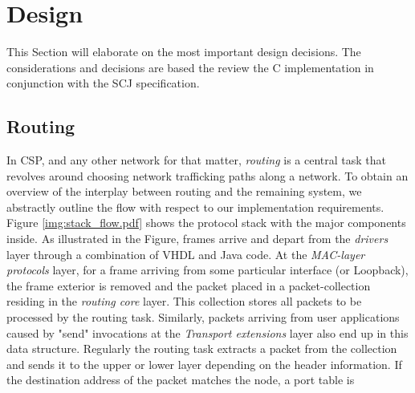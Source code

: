 \section{Design}
This Section will elaborate on the most important design decisions. The considerations and decisions are based the review the C implementation in conjunction with the SCJ specification.

\subsection{Routing}
In CSP, and any other network for that matter, \textit{routing} is a central task that revolves around choosing network trafficking paths along a network. To obtain an overview of the interplay between routing and the remaining system, we abstractly outline the flow with respect to our implementation requirements. Figure \ref{img:stack_flow.pdf} shows the protocol stack with the major components inside. As illustrated in the Figure, frames arrive and depart from the \textit{drivers} layer through a combination of VHDL and Java code. At the \textit{MAC-layer protocols} layer, for a frame arriving from some particular interface (\iic or Loopback), the frame exterior is removed and the packet placed in a packet-collection residing in the \textit{routing core} layer. This collection stores all packets to be processed by the routing task. Similarly, packets arriving from user applications caused by "send" invocations at the \textit{Transport extensions} layer also end up in this data structure. Regularly the routing task extracts a packet from the collection and sends it to the upper or lower layer depending on the header information. If the destination address of the packet matches the node, a port table is  



